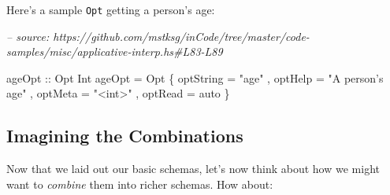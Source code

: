 \documentclass[]{article}
\newenvironment{Shaded}{}{}
\newcommand{\CommentTok}[1]{\textcolor[rgb]{0.38,0.63,0.69}{\textit{#1}}}
\newcommand{\DataTypeTok}[1]{\textcolor[rgb]{0.56,0.13,0.00}{#1}}
\newcommand{\DecValTok}[1]{\textcolor[rgb]{0.25,0.63,0.44}{#1}}
\newcommand{\NormalTok}[1]{#1}
\newcommand{\OperatorTok}[1]{\textcolor[rgb]{0.40,0.40,0.40}{#1}}
\newcommand{\OtherTok}[1]{\textcolor[rgb]{0.00,0.44,0.13}{#1}}
\newcommand{\StringTok}[1]{\textcolor[rgb]{0.25,0.44,0.63}{#1}}
\begin{document}
Here's a sample \texttt{Opt} getting a person's age:

\begin{Shaded}
\begin{Highlighting}[]
\CommentTok{-- source: https://github.com/mstksg/inCode/tree/master/code-samples/misc/applicative-interp.hs#L83-L89}

\OtherTok{ageOpt ::} \DataTypeTok{Opt} \DataTypeTok{Int}
\NormalTok{ageOpt }\OtherTok{=} \DataTypeTok{Opt}
\NormalTok{    \{ optString }\OtherTok{=} \StringTok{"age"}
\NormalTok{    , optHelp   }\OtherTok{=} \StringTok{"A person's age"}
\NormalTok{    , optMeta   }\OtherTok{=} \StringTok{"<int>"}
\NormalTok{    , optRead   }\OtherTok{=}\NormalTok{ auto}
\NormalTok{    \}}
\end{Highlighting}
\end{Shaded}

\begin{Shaded}
\end{Shaded}

\hypertarget{imagining-the-combinations}{%
\subsection{Imagining the Combinations}\label{imagining-the-combinations}}

Now that we laid out our basic schemas, let's now think about how we might want
to \emph{combine} them into richer schemas. How about:
\end{document}
